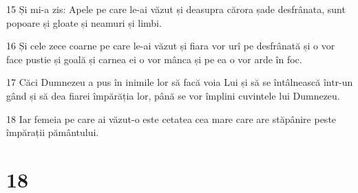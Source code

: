 \par 15 Și mi-a zis: Apele pe care le-ai văzut și deasupra cărora șade desfrânata, sunt popoare și gloate și neamuri și limbi.
\par 16 Și cele zece coarne pe care le-ai văzut și fiara vor urî pe desfrânată și o vor face pustie și goală și carnea ei o vor mânca și pe ea o vor arde în foc.
\par 17 Căci Dumnezeu a pus în inimile lor să facă voia Lui și să se întâlnească într-un gând și să dea fiarei împărăția lor, până se vor împlini cuvintele lui Dumnezeu.
\par 18 Iar femeia pe care ai văzut-o este cetatea cea mare care are stăpânire peste împărații pământului.

\chapter{18}

